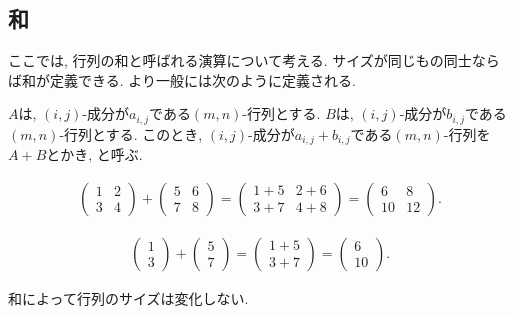 \subsection{和}
ここでは, 行列の和と呼ばれる演算について考える.
サイズが同じもの同士ならば和が定義できる.
より一般には次のように定義される.
\begin{definition}
  \label{def:op:sum}
  $A$は, $(i,j)$-成分が$a_{i,j}$である$(m,n)$-行列とする.
  $B$は, $(i,j)$-成分が$b_{i,j}$である$(m,n)$-行列とする.
  このとき,
  $(i,j)$-成分が$a_{i,j}+b_{i,j}$である$(m,n)$-行列を$A+B$とかき,
  と呼ぶ.  
\end{definition}
\begin{example}
  \begin{align*}
  \begin{pmatrix}
    1&2\\3&4
  \end{pmatrix}+
  \begin{pmatrix}
    5&6\\7&8
  \end{pmatrix}
 =
  \begin{pmatrix}
    1+5&2+6\\3+7&4+8
  \end{pmatrix}
 =
  \begin{pmatrix}
    6&8\\10&12
  \end{pmatrix}.
  \end{align*}  
\end{example}
\begin{example}
  \begin{align*}
  \begin{pmatrix}
    1\\3
  \end{pmatrix}+
  \begin{pmatrix}
    5\\7
  \end{pmatrix}
 =
  \begin{pmatrix}
    1+5\\3+7
  \end{pmatrix}
 =
  \begin{pmatrix}
    6\\10
  \end{pmatrix}.
  \end{align*}  
\end{example}
\begin{remark}
  和によって行列のサイズは変化しない.
\end{remark}



